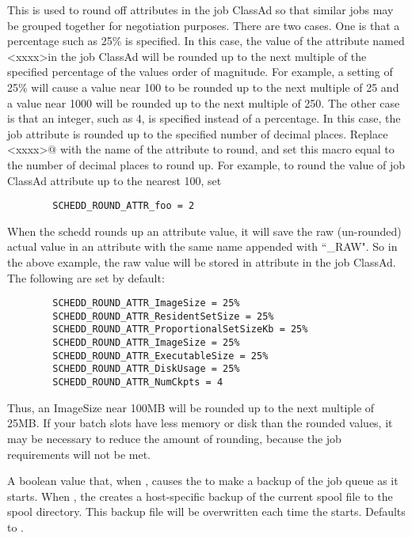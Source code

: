 \begin{description}
\label{param:ScheddRoundAttr}
\item[\Macro{SCHEDD\_ROUND\_ATTR\_<xxxx>}]
  This is used to round off attributes in
  the job ClassAd so that similar jobs may be grouped together for
  negotiation purposes.  There are two cases.  One is that a
  percentage such as 25\% is specified.  In this case, the value of
  the attribute named \verb@<xxxx>\@ in the job ClassAd will be
  rounded up to the next multiple of the specified percentage of the
  values order of magnitude.  For example, a setting of 25\% will
  cause a value near 100 to be rounded up to the next multiple of 25
  and a value near 1000 will be rounded up to the next multiple of
  250.  The other case is that an integer, such as 4, is specified
  instead of a percentage.  In this case, the job attribute is rounded
  up to the specified number of decimal places.
  Replace \verb@<xxxx>@ with the name of the attribute to round, and set this
  macro equal to the number of decimal places to round up.  For example, to
  round the value of job ClassAd attribute   up to the nearest
  100, set 
\begin{verbatim}
        SCHEDD_ROUND_ATTR_foo = 2
\end{verbatim}
  When the schedd rounds up an attribute value, it will save the raw 
  (un-rounded) actual value in an attribute with the same name appended
  with ``\_RAW".  So in the above example, the raw value will be stored
  in attribute  in the job ClassAd.
  The following are set by default:
\begin{verbatim}
        SCHEDD_ROUND_ATTR_ImageSize = 25%
        SCHEDD_ROUND_ATTR_ResidentSetSize = 25%
        SCHEDD_ROUND_ATTR_ProportionalSetSizeKb = 25%
        SCHEDD_ROUND_ATTR_ImageSize = 25%
        SCHEDD_ROUND_ATTR_ExecutableSize = 25%
        SCHEDD_ROUND_ATTR_DiskUsage = 25%
        SCHEDD_ROUND_ATTR_NumCkpts = 4
\end{verbatim}
  Thus, an ImageSize near 100MB will be rounded up to the next
  multiple of 25MB.  If your batch slots have less
  memory or disk than the rounded values, it may be necessary to
  reduce the amount of rounding, because the job requirements
  will not be met.

\label{param:ScheddBackupSpool}
\item[\Macro{SCHEDD\_BACKUP\_SPOOL}]
  A boolean value that, when , causes the
   to make a backup of the job queue as it starts.
  When , the  creates a host-specific
  backup of the current spool file to the spool directory.  This
  backup file will be overwritten each time the  starts.
  Defaults to .


\end{description}
